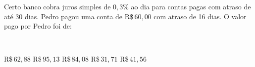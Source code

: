 \parbox{\linewidth}{

Certo banco cobra juros simples de $0{,}3$\% ao dia para contas pagas com atraso de até 30 dias. Pedro pagou uma conta de R\$\,$60{,}00$ com atraso de 16 dias. O valor pago por Pedro foi de:}\vspace{2mm}\\\parbox{\linewidth}{

R\$\,$62{,}88$
R\$\,$95{,}13$
R\$\,$84{,}08$
R\$\,$31{,}71$
R\$\,$41{,}56$

}


